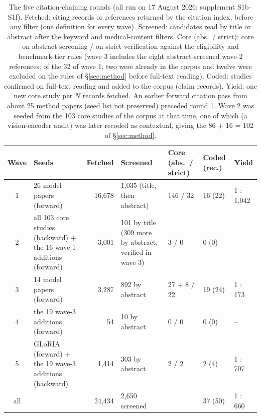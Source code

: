 \begin{table}[!tbp]
\centering\scriptsize\setlength\tabcolsep{3pt}\renewcommand{\arraystretch}{0.95}
\caption{The five citation-chaining rounds (all run on 17 August 2026; supplement S1b--S1f). Fetched: citing records or references returned by the citation index, before any filter (one definition for every wave). Screened: candidates read by title or abstract after the keyword and medical-content filters. Core (abs.\ / strict): core on abstract screening / on strict verification against the eligibility and benchmark-tier rules (wave 3 includes the eight abstract-screened wave-2 references; of the 32 of wave 1, two were already in the corpus and twelve were excluded on the rules of \S\ref{sec:method} before full-text reading). Coded: studies confirmed on full-text reading and added to the corpus (claim records). Yield: one new core study per $N$ records fetched. An earlier forward citation pass from about 25 method papers (seed list not preserved) preceded round 1. Wave 2 was seeded from the 103 core studies of the corpus at that time, one of which (a vision-encoder audit) was later recoded as contextual, giving the 86 + 16 = 102 of \S\ref{sec:method}.}
\label{tab:chaining}
\begin{tabular}{@{}cL{4.6cm}rL{4.4cm}C{1.9cm}C{1.4cm}l@{}}
\toprule
Wave & Seeds & Fetched & Screened & Core (abs.\ / strict) & Coded (rec.) & Yield \\
 & 26 model papers (forward) & 16,678 & 1,035 (title, then abstract) & 146 / 32 & 16 (22) & 1 : 1,042 \\
2 & all 103 core studies (backward) + the 16 wave-1 additions (forward) & 3,001 & 101 by title (309 more by abstract, verified in wave 3) & 3 / 0 & 0 (0) & -- \\
3 & 14 model papers (forward) & 3,287 & 892 by abstract & 27 + 8 / 22 & 19 (24) & 1 : 173 \\
4 & the 19 wave-3 additions (forward) & 54 & 10 by abstract & 0 / 0 & 0 (0) & -- \\
5 & GLoRIA (forward) + the 19 wave-3 additions (backward) & 1,414 & 303 by abstract & 2 / 2 & 2 (4) & 1 : 707 \\
\midrule
all &  & 24,434 & 2,650 screened &  & 37 (50) & 1 : 660 \\
\bottomrule
\end{tabular}
\end{table}
